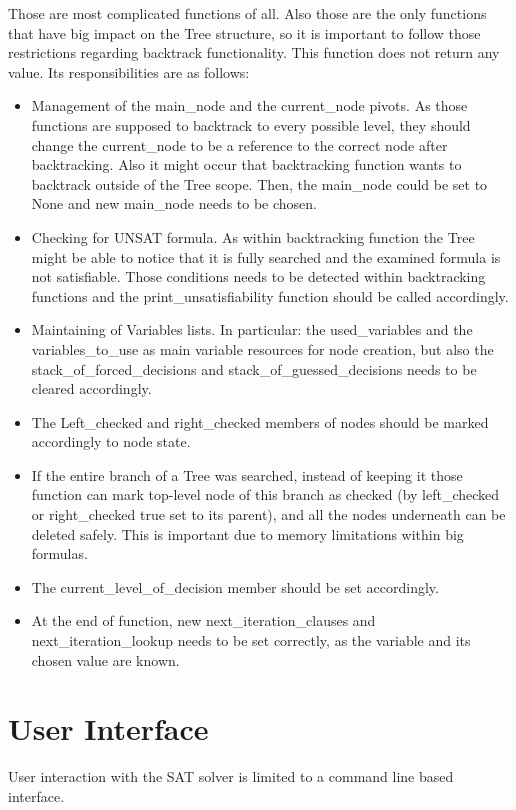 \documentclass[12pt,english,pdflatex]{aghdpl}
\begin{document}
Those are most complicated functions of all. Also those are the only
functions that have big impact on the Tree structure, so it is important
to follow those restrictions regarding backtrack functionality. This
function does not return any value. Its responsibilities are as follows:
\begin{itemize}
\item Management of the main\_node and the current\_node pivots. As those functions
are supposed to backtrack to every possible level, they should change
the current\_node to be a reference to the correct node after backtracking.
Also it might occur that backtracking function wants to backtrack
outside of the Tree scope. Then, the main\_node could be set to None and new
main\_node needs to be chosen.
\item Checking for UNSAT formula. As within backtracking function the Tree might
be able to notice that it is fully searched and the examined formula is not satisfiable.
Those conditions needs to be detected within backtracking functions
and the print\_unsatisfiability function should be called accordingly.
\item Maintaining of Variables lists. In particular: the used\_variables and
the variables\_to\_use as main variable resources for node creation, but
also the stack\_of\_forced\_decisions and stack\_of\_guessed\_decisions
needs to be cleared accordingly.
\item The Left\_checked and right\_checked members of nodes should be marked
accordingly to node state.
\item If the entire branch of a Tree was searched, instead of keeping it those
function can mark top-level node of this branch as checked (by left\_checked
or right\_checked true set to its parent), and all the nodes underneath
can be deleted safely. This is important
due to memory limitations within big formulas.
\item The current\_level\_of\_decision member should be set accordingly.
\item At the end of function, new next\_iteration\_clauses and next\_iteration\_lookup
needs to be set correctly, as the variable and its chosen value  are known.
\end{itemize}

\section{User Interface}
\label{sec:UI}

User interaction with the SAT solver is limited to a command line based
interface. 
\end{document}
